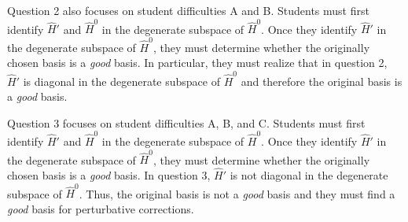 \documentclass[aps,pra,showpacs,showkeys,twocolumn,groupedaddress]{revtex4-1}
\begin{document}

Question 2 also focuses  on student difficulties A and B.  Students must first identify $\hat{H}'$ and $\hat{H}^0$ in the degenerate subspace of $\hat{H}^0$.  Once they identify $\hat{H}'$ in the degenerate subspace of $\hat{H}^0$, they must determine whether the originally chosen basis is a {\it good} basis.  In particular, they must realize that in question 2, $\hat{H}'$ is diagonal in the degenerate subspace of $\hat{H}^0$ and therefore the original basis is a {\it good} basis.  %

Question 3 focuses  on student difficulties A, B, and C.  Students must first identify $\hat{H}'$ and $\hat{H}^0$ in the degenerate subspace of $\hat{H}^0$.  Once they identify $\hat{H}'$ in the degenerate subspace of $\hat{H}^0$, they must determine whether the originally chosen basis is a {\it good} basis.  In question 3, $\hat{H}'$ is not diagonal in the degenerate subspace of $\hat{H}^0$. Thus, the original basis is not a {\it good} basis and they must find a {\it good} basis for perturbative corrections.  
\end{document}
